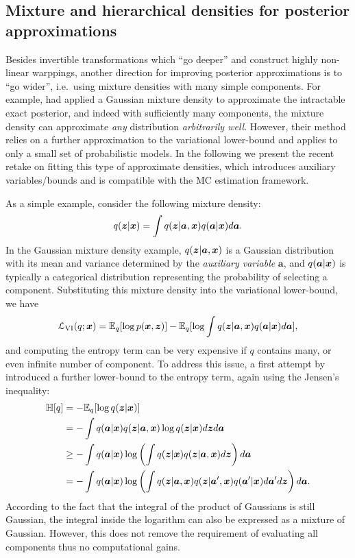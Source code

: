 \subsection{Mixture and hierarchical densities for posterior approximations}

Besides invertible transformations which ``go deeper'' and construct highly non-linear warppings, another direction for improving posterior approximations is to ``go wider'', i.e.~using mixture densities with many simple components. For example, \cite{jaakkola:gmm1998} had applied a Gaussian mixture density to approximate the intractable exact posterior, and indeed with sufficiently many components, the mixture density can approximate \emph{any} distribution \emph{arbitrarily well}.
%
However, their method relies on a further approximation to the variational lower-bound and applies to only a small set of probabilistic models. In the following we present the recent retake on fitting this type of approximate densities, which introduces auxiliary variables/bounds and is compatible with the MC estimation framework.

As a simple example, consider the following mixture density:
$$q(\bm{z} | \bm{x}) = \int q(\bm{z} | \bm{a}, \bm{x}) q(\bm{a} | \bm{x}) d \bm{a}.$$
In the Gaussian mixture density example, $q(\bm{z} | \bm{a}, \bm{x})$ is a Gaussian distribution with its mean and variance determined by the \emph{auxiliary variable} $\bm{a}$, and $q(\bm{a} | \bm{x})$ is typically a categorical distribution representing the probability of selecting a component. Substituting this mixture density into the variational lower-bound, we have
\begin{equation}
\mathcal{L}_{\text{VI}}(q; \bm{x}) = \mathbb{E}_q[\log p(\bm{x}, \bm{z})] - \mathbb{E}_q[\log \int q(\bm{z} | \bm{a}, \bm{x}) q(\bm{a} | \bm{x}) d \bm{a} ],
\label{eq:appendix_vi_lowerbound_mixture}
\end{equation}
and computing the entropy term can be very expensive if $q$ contains many, or even infinite number of component. To address this issue, a first attempt by \cite{gershman:nonparametric_vi2012} introduced a further lower-bound to the entropy term, again using the Jensen's inequality:
%
\begin{equation}
\begin{aligned}
\mathbb{H}[q] &= - \mathbb{E}_q[\log q(\bm{z} | \bm{x}) ] \\
& = -\int q(\bm{a} | \bm{x}) q(\bm{z} | \bm{a}, \bm{x}) \log q(\bm{z} | \bm{x}) d \bm{z} d\bm{a} \\
& \geq -\int q(\bm{a} | \bm{x}) \log \left( \int q(\bm{z} | \bm{x}) q(\bm{z} | \bm{a}, \bm{x}) d \bm{z} \right) d\bm{a} \\
& = -\int q(\bm{a} | \bm{x}) \log \left( \int q(\bm{z} | \bm{a}, \bm{x})  q(\bm{z} | \bm{a}', \bm{x}) q(\bm{a}' | \bm{x}) d\bm{a}' d \bm{z} \right) d\bm{a}.
\end{aligned}
\end{equation}
According to the fact that the integral of the product of Gaussians is still Gaussian, the integral inside the logarithm can also be expressed as a mixture of Gaussian. However, this does not remove the requirement of evaluating all components thus no computational gains.

